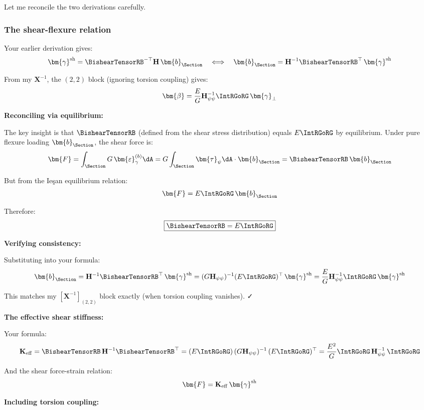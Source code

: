 Let me reconcile the two derivations carefully.

\subsubsection{The shear-flexure
relation}\label{the-shear-flexure-relation}

Your earlier derivation gives:
\[\bm{\gamma}^{\rm sh} = \BishearTensorRB^{-\top}\mathbf{H}\,\bm{b}_{\Section} \quad \Longleftrightarrow \quad \bm{b}_{\Section} = \mathbf{H}^{-1}\BishearTensorRB^\top\,\bm{\gamma}^{\rm sh}\]

From my \(\mathbf{X}^{-1}\), the \((2,2)\) block (ignoring torsion
coupling) gives:
\[\bm{\beta} = \frac{E}{G}\mathbf{H}_{\psi\psi}^{-1}\IntRGoRG\,\bm{\gamma}_\perp\]

\textbf{Reconciling via equilibrium:}

The key insight is that \(\BishearTensorRB\) (defined from the shear
stress distribution) equals \(E\IntRGoRG\) by equilibrium. Under pure
flexure loading \(\bm{b}_{\Section}\), the shear force is:
\[\bm{F} = \int_\Section G\,\bm{\varepsilon}_\gamma^{(b)} \dA = G\int_\Section \bm{\tau}_\psi \dA \cdot \bm{b}_{\Section} = \BishearTensorRB\,\bm{b}_{\Section}\]

But from the Ieşan equilibrium relation:
\[\bm{F} = E\IntRGoRG\,\bm{b}_{\Section}\]

Therefore: \[\boxed{\BishearTensorRB = E\IntRGoRG}\]

\textbf{Verifying consistency:}

Substituting into your formula:
\[\bm{b}_{\Section} = \mathbf{H}^{-1}\BishearTensorRB^\top\,\bm{\gamma}^{\rm sh} = (G\mathbf{H}_{\psi\psi})^{-1}(E\IntRGoRG)^\top\,\bm{\gamma}^{\rm sh} = \frac{E}{G}\mathbf{H}_{\psi\psi}^{-1}\IntRGoRG\,\bm{\gamma}^{\rm sh}\]

This matches my \([\mathbf{X}^{-1}]_{(2,2)}\) block exactly (when
torsion coupling vanishes). ✓

\textbf{The effective shear stiffness:}

Your formula:
\[\mathbf{K}_{\rm eff} = \BishearTensorRB\,\mathbf{H}^{-1}\BishearTensorRB^\top = (E\IntRGoRG)\,(G\mathbf{H}_{\psi\psi})^{-1}\,(E\IntRGoRG)^\top = \frac{E^2}{G}\IntRGoRG\,\mathbf{H}_{\psi\psi}^{-1}\,\IntRGoRG\]

And the shear force-strain relation:
\[\bm{F} = \mathbf{K}_{\rm eff}\,\bm{\gamma}^{\rm sh}\]

\textbf{Including torsion coupling:}

